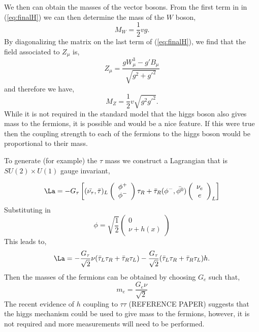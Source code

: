 We then can obtain the masses of the vector bosons.
From the first term in in (\ref{eq:finalH}) we can then determine the 
mass of the $W$ boson, 
\begin{equation}
M_{W}=\frac{1}{2}v g.
\end{equation}
By diagonalizing the matrix on the last term of (\ref{eq:finalH}), we find that
the field associated to $Z_{\mu}$ is,
\begin{equation}
Z_{\mu}= \frac{gW_{\mu}^{3}-g'B_{\mu}}{\sqrt{g^{2}+g'^{2}}}
\end{equation}
and therefore we have,
\begin{equation}
M_{Z}=\frac{1}{2}v\sqrt{g^{2}g'^{2}}.
\end{equation}
While it is not required in the standard model that the higgs boson 
also gives mass to the fermions, it is possible and would be a nice
feature. If this were true then the coupling strength to each of the fermions
to the higgs boson would be proportional to their mass.

To generate (for example) the $\tau$ mass we construct a 
Lagrangian that is $SU(2)\times U(1)$ gauge invariant,

\begin{equation}
\La = -G_{\tau}\left[
      (\bar{\nu_{\tau}},\bar{\tau})_{L}
	\left( \begin{array}{c}
      \phi^{+} \\
      \phi^{-}
      \end{array}\right)\tau_{R} 
    +
      \bar{\tau}_{R}(\phi^{-},\bar{\phi^{0}})
	\left( \begin{array}{c}
      \nu_{e} \\
      e
      \end{array}\right)_{L}
    \right]
\end{equation}
Substituting in
\begin{equation}
\phi=\sqrt{\frac{1}{2}}
\left( \begin{array}{c}
      0 \\
      \nu + h(x)
      \end{array}\right)
\end{equation}
This leads to,
\begin{equation}
\La = -\frac{G_{\tau}}{\sqrt{2}}\nu(\bar{\tau}_{L}\tau_{R}+\bar{\tau}_{R}\tau_{L})
-\frac{G_{\tau}}{\sqrt{2}}(\bar{\tau}_{L}\tau_{R}+\bar{\tau}_{R}\tau_{L})h.
\end{equation}
Then the masses of the fermions can be obtained by choosing $G_{e}$ such that,
\begin{equation}
m_{e}=\frac{G_{e}\nu}{\sqrt{2}}
\end{equation}
The recent evidence of $h$ coupling to $\tau\tau$ (REFERENCE PAPER) suggests
that the higgs mechanism could be used to give mass to the fermions, however,
it is not required and more measurements will need to be performed.

